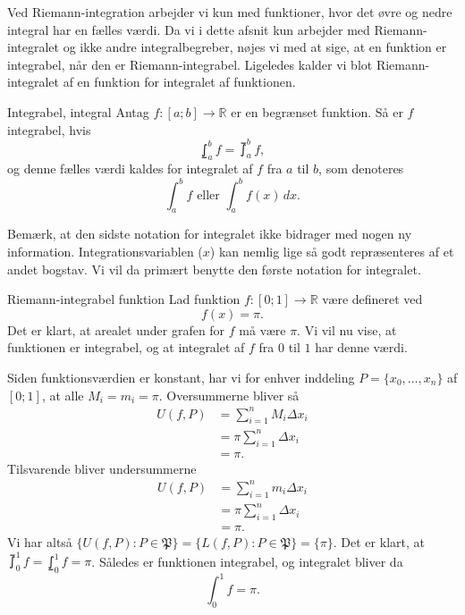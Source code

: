 Ved Riemann-integration arbejder vi kun med funktioner, hvor det øvre og nedre integral har en fælles værdi.
Da vi i dette afsnit kun arbejder med Riemann-integralet og ikke andre integralbegreber, nøjes vi med at sige, at en funktion er integrabel, når den er Riemann-integrabel.
Ligeledes kalder vi blot Riemann-integralet af en funktion for integralet af funktionen.

\begin{definition}[label=def:integrabel]{Integrabel, integral}{}
  Antag $f:[a;b] \to \mathbb{R}$ er en begrænset funktion. 
  Så er $f$ integrabel, hvis
  \[
  \lowint_{a}^{b} f = \upint_{a}^{b} f,   
  \] 
  og denne fælles værdi kaldes for integralet af $f$ fra $a$ til $b$, som denoteres 
  \[
  \int_{a}^{b} f \text{ eller }  \int_{a}^{b} f(x) \,dx.
  \] 
\end{definition}

Bemærk, at den sidste notation for integralet ikke bidrager med nogen ny information.
 Integrationsvariablen ($x$) kan nemlig lige så godt repræsenteres af et andet bogstav.
Vi vil da primært benytte den første notation for integralet.

\begin{example}[label=exa:Riemann-integrabel]{Riemann-integrabel funktion}{}
  Lad funktion $f:[0; 1] \to \mathbb{R}$ være defineret ved
  \[
  f(x)=\pi.
  \]
  Det er klart, at arealet under grafen for $f$ må være $\pi $.
  Vi vil nu vise, at funktionen er integrabel, og at integralet af $f$ fra $0$ til $1$ har denne værdi.

  Siden funktionsværdien er konstant, har vi for enhver inddeling $P=\{ x_0, \ldots , x_n \} $ af $[0;1]$, at alle $M_i=m_i=\pi $.
  Oversummerne bliver så
  \begin{equation*}
  \begin{split}
    U(f, P)&=\sum_{i=1}^{n} M_i \Delta x_i \\
    &= \pi \sum_{i=1}^{n} \Delta x_i \\
    &= \pi.
  \end{split}
  \end{equation*}
Tilsvarende bliver undersummerne
  \begin{equation*}
  \begin{split}
    U(f, P)&=\sum_{i=1}^{n} m_i \Delta x_i \\
    &= \pi \sum_{i=1}^{n} \Delta x_i \\
    &= \pi.
  \end{split}
  \end{equation*}
  Vi har altså $\{ U(f, P):P \in \mathfrak{P}\} =\{ L(f, P):P \in \mathfrak{P} \} =\{ \pi  \} $. 
  Det er klart, at $\upint_{0}^{1} f = \lowint_{0}^{1} f =\pi $.
  Således er funktionen integrabel, og integralet bliver da
  \[
  \int_{0}^{1} f = \pi. 
  \] 
\end{example}



